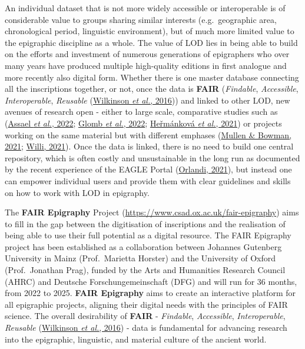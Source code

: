 \documentclass[
  12pt,
]{scrreprt}
\begin{document}
An individual dataset that is not more widely accessible or
interoperable is of considerable value to groups sharing similar
interests (e.g.~geographic area, chronological period, linguistic
environment), but of much more limited value to the epigraphic
discipline as a whole. The value of LOD lies in being able to build on
the efforts and investment of numerous generations of epigraphers who
over many years have produced multiple high-quality editions in first
analogue and more recently also digital form. Whether there is one
master database connecting all the inscriptions together, or not, once
the data is \textbf{FAIR} (\emph{Findable}, \emph{Accessible},
\emph{Interoperable}, \emph{Reusable}
(\protect\hyperlink{ref-wilkinson_fair_2016}{Wilkinson \emph{et al.},
2016})) and linked to other LOD, new avenues of research open - either
to large scale, comparative studies such as
(\protect\hyperlink{ref-assael_restoring_2022}{Assael \emph{et al.},
2022}; \protect\hyperlink{ref-glomb_popularity_2022}{Glomb \emph{et
al.}, 2022};
\protect\hyperlink{ref-hermankova_inscriptions_2021}{Heřmánková \emph{et
al.}, 2021}) or projects working on the same material but with different
emphases (\protect\hyperlink{ref-mullen_manual_2021}{Mullen \& Bowman,
2021}; \protect\hyperlink{ref-willi_manual_2021}{Willi, 2021}). Once the
data is linked, there is no need to build one central repository, which
is often costly and unsustainable in the long run as documented by the
recent experience of the EAGLE Portal
(\protect\hyperlink{ref-orlandi_digital_2021}{Orlandi, 2021}), but
instead one can empower individual users and provide them with clear
guidelines and skills on how to work with LOD in epigraphy.

The \textbf{FAIR Epigraphy} Project
(\url{https://www.csad.ox.ac.uk/fair-epigraphy}) aims to fill in the gap
between the digitisation of inscriptions and the realisation of being
able to use their full potential as a digital resource. The FAIR
Epigraphy project has been established as a collaboration between
Johannes Gutenberg University in Mainz (Prof.~Marietta Horster) and the
University of Oxford (Prof.~Jonathan Prag), funded by the Arts and
Humanities Research Council (AHRC) and Deutsche Forschungemeinschaft
(DFG) and will run for 36 months, from 2022 to 2025. \textbf{FAIR
Epigraphy} aims to create an interactive platform for all epigraphic
projects, aligning their digital needs with the principles of FAIR
science. The overall desirability of \textbf{FAIR} - \emph{Findable},
\emph{Accessible}, \emph{Interoperable}, \emph{Reusable}
(\protect\hyperlink{ref-wilkinson_fair_2016}{Wilkinson \emph{et al.},
2016}) - data is fundamental for advancing research into the epigraphic,
linguistic, and material culture of the ancient world.
\end{document}
